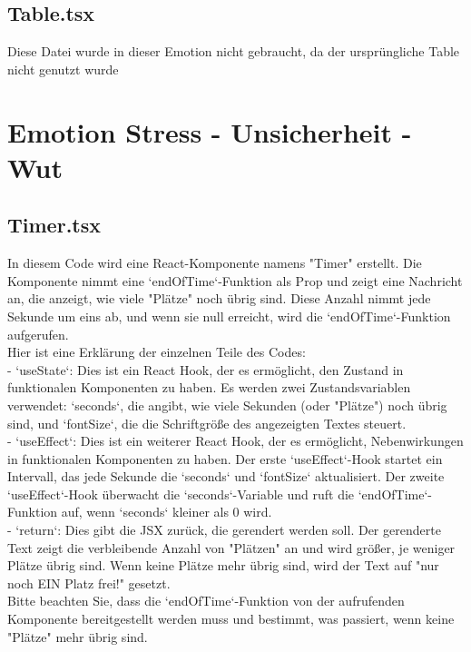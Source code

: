 \documentclass[./dokumentation.tex]{subfiles}
\begin{document}
\subsection{Table.tsx}
Diese Datei wurde in dieser Emotion nicht gebraucht, da der ursprüngliche Table nicht genutzt wurde 



\section{Emotion Stress - Unsicherheit - Wut}
\subsection{Timer.tsx}
In diesem Code wird eine React-Komponente namens "Timer" erstellt. Die Komponente nimmt eine `endOfTime`-Funktion als Prop und zeigt eine Nachricht an, die anzeigt, wie viele "Plätze" noch übrig sind. Diese Anzahl nimmt jede Sekunde um eins ab, und wenn sie null erreicht, wird die `endOfTime`-Funktion aufgerufen.\\

Hier ist eine Erklärung der einzelnen Teile des Codes:\\
- `useState`: Dies ist ein React Hook, der es ermöglicht, den Zustand in funktionalen Komponenten zu haben. Es werden zwei Zustandsvariablen verwendet: `seconds`, die angibt, wie viele Sekunden (oder "Plätze") noch übrig sind, und `fontSize`, die die Schriftgröße des angezeigten Textes steuert.\\
- `useEffect`: Dies ist ein weiterer React Hook, der es ermöglicht, Nebenwirkungen in funktionalen Komponenten zu haben. Der erste `useEffect`-Hook startet ein Intervall, das jede Sekunde die `seconds` und `fontSize` aktualisiert. Der zweite `useEffect`-Hook überwacht die `seconds`-Variable und ruft die `endOfTime`-Funktion auf, wenn `seconds` kleiner als 0 wird.\\
- `return`: Dies gibt die JSX zurück, die gerendert werden soll. Der gerenderte Text zeigt die verbleibende Anzahl von "Plätzen" an und wird größer, je weniger Plätze übrig sind. Wenn keine Plätze mehr übrig sind, wird der Text auf "nur noch EIN Platz frei!" gesetzt.\\
Bitte beachten Sie, dass die `endOfTime`-Funktion von der aufrufenden Komponente bereitgestellt werden muss und bestimmt, was passiert, wenn keine "Plätze" mehr übrig sind.
\end{document}
